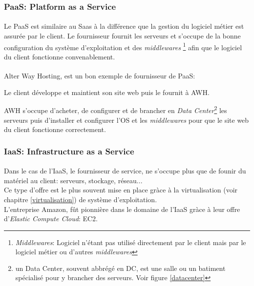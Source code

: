 \subsubsection{PaaS: Platform as a Service}
\paragraph*{}
Le PaaS est similaire au Saas à la différence que la gestion du logiciel métier est assurée par le client.
Le fournisseur fournit les serveurs et s'occupe de la bonne configuration du système d'exploitation et des \emph{middlewares}
\footnote{\emph{Middlewares}: Logiciel n'étant pas utilisé directement par le client mais par le logiciel métier ou d'autres \emph{middlewares}} afin
que le logiciel du client fonctionne convenablement.

\paragraph*{}
Alter Way Hosting, est un bon exemple de fournisseur de PaaS: \\
\begin{listi}
\item 	Le client développe et maintient son site web puis le fournit à AWH.\\
\item 	AWH s'occupe d'acheter, de configurer et de brancher en \emph{Data Center}\footnote{un Data Center, souvent abbrégé en DC, est une salle
		ou un batiment spécialisé pour y brancher des serveurs. Voir figure \ref{datacenter}} les serveurs puis d'installer et configurer l'OS et les \emph{middlewares} pour que
		le site web du client fonctionne correctement.
\end{listi}

\subsubsection{IaaS: Infrastructure as a Service}
\paragraph*{}
Dans le cas de l'IaaS, le fournisseur de service, ne s'occupe plus que de founir du matériel au client: serveurs, stockage, réseau...
\\
Ce type d'offre est le plus souvent mise en place gràce à la virtualisation (voir chapitre \ref{virtualisation}) de système d'exploitation.
\\
L'entreprise Amazon, fût pionnière dans le domaine de l'IaaS gràce à leur offre d'\textsl{Elastic Compute Cloud}: EC2.

